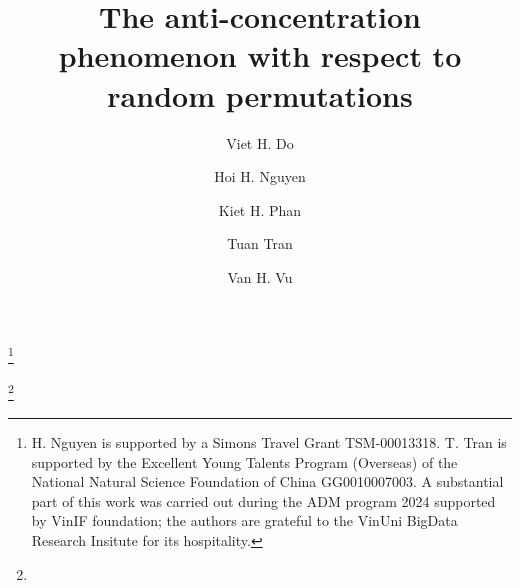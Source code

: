 \documentclass[reqno]{amsart}
\theoremstyle{plain}
\theoremstyle{definition}
\begin{document}


\title{The anti-concentration phenomenon with respect to random permutations}

\author{Viet H. Do}
\address{Department of Mathematics, Yale University, New Haven, CT 06511}


\author{Hoi H. Nguyen}
\address{Department of Mathematics, The Ohio State University, Columbus OH 43210}
\thanks{H. Nguyen is supported by a Simons Travel Grant TSM-00013318. T. Tran is supported by the Excellent Young Talents Program
(Overseas) of the National Natural Science Foundation of China GG0010007003. A substantial part of this work was carried out during the ADM program 2024 supported by VinIF foundation; the authors are grateful to the VinUni BigData Research Insitute  for its hospitality.}

\author{Kiet  H. Phan}
\address{School of Mathematics and Statistics, UNSW Sydney, Sydney NSW 2052, Australia}

\author{Tuan Tran}
\address{School of Mathematical Sciences, University of Science and Technology of China, Hefei, Anhui 230026, China}
\thanks{}

\author{Van H. Vu}
\address{Department of Mathematics, Hong Kong University, Hong Kong}
\end{document}
